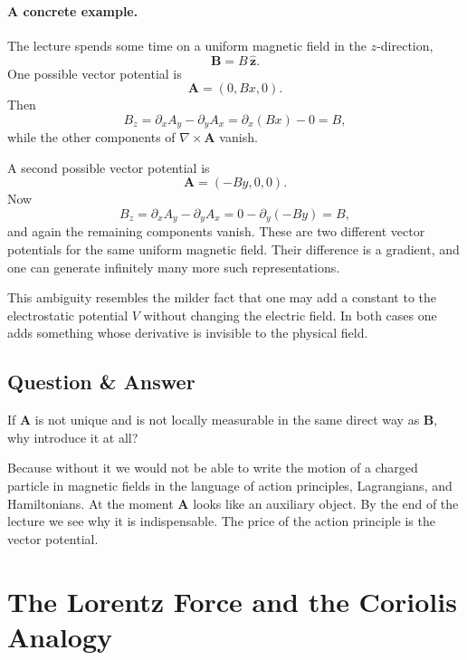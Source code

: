 \paragraph{A concrete example.}
The lecture spends some time on a uniform magnetic field in the \(z\)-direction,
\begin{equation}
\mathbf B=B\,\hat{\mathbf z}.
\end{equation}
One possible vector potential is
\begin{equation}
\mathbf A=(0,Bx,0).
\end{equation}
Then
\begin{equation}
B_z=\partial_xA_y-\partial_yA_x=\partial_x(Bx)-0=B,
\end{equation}
while the other components of \(\nabla\times \mathbf A\) vanish.

A second possible vector potential is
\begin{equation}
\mathbf A=(-By,0,0).
\end{equation}
Now
\begin{equation}
B_z=\partial_xA_y-\partial_yA_x=0-\partial_y(-By)=B,
\end{equation}
and again the remaining components vanish. These are two different vector potentials for the same uniform magnetic field. Their difference is a gradient, and one can generate infinitely many more such representations.

This ambiguity resembles the milder fact that one may add a constant to the electrostatic potential \(V\) without changing the electric field. In both cases one adds something whose derivative is invisible to the physical field.

\subsection{Question \& Answer}

If \(\mathbf A\) is not unique and is not locally measurable in the same direct way as \(\mathbf B\), why introduce it at all?

Because without it we would not be able to write the motion of a charged particle in magnetic fields in the language of action principles, Lagrangians, and Hamiltonians. At the moment \(\mathbf A\) looks like an auxiliary object. By the end of the lecture we see why it is indispensable. The price of the action principle is the vector potential.

\section{The Lorentz Force and the Coriolis Analogy}

